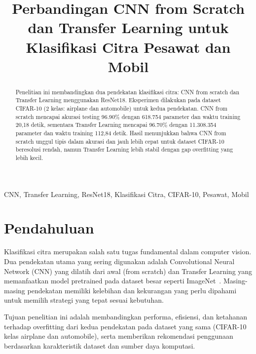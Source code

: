 \documentclass[conference]{IEEEtran}
\begin{document}
\title{Perbandingan CNN from Scratch dan Transfer Learning untuk Klasifikasi Citra Pesawat dan Mobil}

\author{
}

\maketitle

\begin{abstract}
Penelitian ini membandingkan dua pendekatan klasifikasi citra: CNN from scratch dan Transfer Learning menggunakan ResNet18. Eksperimen dilakukan pada dataset CIFAR-10 (2 kelas: airplane dan automobile) untuk kedua pendekatan. CNN from scratch mencapai akurasi testing 96.90\% dengan 618.754 parameter dan waktu training 20,18 detik, sementara Transfer Learning mencapai 96.70\% dengan 11.308.354 parameter dan waktu training 112,84 detik. Hasil menunjukkan bahwa CNN from scratch unggul tipis dalam akurasi dan jauh lebih cepat untuk dataset CIFAR-10 beresolusi rendah, namun Transfer Learning lebih stabil dengan gap overfitting yang lebih kecil.
\end{abstract}

\begin{IEEEkeywords}
CNN, Transfer Learning, ResNet18, Klasifikasi Citra, CIFAR-10, Pesawat, Mobil
\end{IEEEkeywords}

\section{Pendahuluan}
Klasifikasi citra merupakan salah satu tugas fundamental dalam computer vision. Dua pendekatan utama yang sering digunakan adalah Convolutional Neural Network (CNN) yang dilatih dari awal (from scratch) dan Transfer Learning yang memanfaatkan model pretrained pada dataset besar seperti ImageNet~\cite{imagenet}. Masing-masing pendekatan memiliki kelebihan dan kekurangan yang perlu dipahami untuk memilih strategi yang tepat sesuai kebutuhan.

Tujuan penelitian ini adalah membandingkan performa, efisiensi, dan ketahanan terhadap overfitting dari kedua pendekatan pada dataset yang sama (CIFAR-10 kelas airplane dan automobile), serta memberikan rekomendasi penggunaan berdasarkan karakteristik dataset dan sumber daya komputasi.
\end{document}
